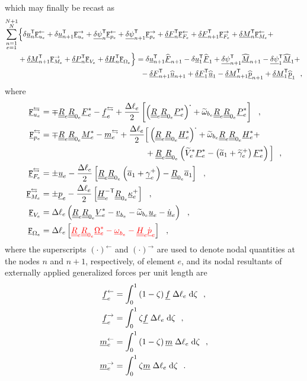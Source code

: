 \documentclass[12pt,a4paper,oneside,english]{abntex2} %
\newcommand{\fix}[1]{{\color{red}#1}}
\newcommand{\vect}[1]{\underline{#1}}
\newcommand{\uvec}[1]{\overline{#1}}
\def\tens#1{\underline{\underline{#1}}}
\def\til#1{\widetilde{#1}}
\def\lb{\left[}
\def\rb{\right]}
\def\lp{\left(}
\def\rp{\right)}
\def\T{\mathsf{T}}
\def\aone{\uvec{a}_1}
\def\aonetil{\til{a}_1}
\def\dotout{^{\boldsymbol{\cdot}}}
\def\R{\tens{R}}
\def\u{\vect{u}}
\def\udot{\dot{\u}}
\def\uhat{\widehat{\u}}
\def\gam{\vect{\gamma}}
\def\gamp{\gam^{+}}
\def\kap{\vect{\kappa}}
\def\kapp{\kap^{+}}
\def\V{\vect{V}}
\def\Vs{\V^{*}}
\def\Om{\vect{\Omega}}
\def\Oms{\Om^{*}}
\def\P{\vect{P}}
\def\Ps{\P^*}
\def\Hv{\vect{H}}
\def\Hvs{\Hv^*}
\def\H{\tens{H}}
\def\p{\vect{p}}
\def\pdot{\dot{\p}}
\def\phat{\widehat{\p}}
\def\F{\vect{F}}
\def\Fhat{\widehat{\F}}
\def\Fs{\F^*}
\def\M{\vect{M}}
\def\Mhat{\widehat{\M}}
\def\Ms{\M^*}
\def\f{\vect{f}}
\def\m{\vect{m}}
\def\delF{\vect{\delta F}}
\def\delM{\vect{\delta M}}
\def\delP{\vect{\delta P}}
\def\delH{\vect{\delta H}}
\def\delpsi{\vect{\delta\psi}}
\def\Deltal{\Delta \ell_e}
\def\dlotwo{\frac{\Deltal}{2}}
\def\d{\textnormal{d}}
\def\vbe{\vect{v}_{b_e}}
\def\ombe{\vect{\omega}_{b_e}}
\def\omtilbe{\til{\omega}_{b_e}}
\def\ue{\u_e}
\def\udote{\udot_e}
\def\pe{\p_e}
\def\pdote{\pdot_e}
\def\Vse{\Vs_e}
\def\Vtilse{\til{V}^*_{e}}
\def\Omse{\Oms_e}
\def\gampe{\gamp_e}
\def\kappe{\kapp_e}
\def\gamptile{\til{\gamma}^{+}_e}
\def\Fse{\Fs_e}
\def\Mse{\Ms_e}
\def\Pse{\Ps_e}
\def\Hse{\Hvs_e}
\def\He{\H_e}
\def\HinvTe{\H^{-\T}_e}
\def\fe{\f_e}
\def\me{\m_e}
\def\Re{\R_{e}}
\def\Rze{\R_{0_e}}
\def\Fu{\mathtt{\vect{F}}_{u_e}}
\def\Fum{\Fu^\leftarrow}
\def\Fup{\Fu^\rightarrow}
\def\Fump{\Fu^{\leftrightarrows}}
\def\Fp{\mathtt{\vect{F}}_{p_e}}
\def\Fpm{\Fp^\leftarrow}
\def\Fpp{\Fp^\rightarrow}
\def\Fpmp{\Fp^{\leftrightarrows}}
\def\FF{\mathtt{\vect{F}}_{F_e}}
\def\FFm{\FF^\leftarrow}
\def\FFp{\FF^\rightarrow}
\def\FFmp{\FF^{\leftrightarrows}}
\def\FM{\mathtt{\vect{F}}_{M_e}}
\def\FMm{\FM^\leftarrow}
\def\FMp{\FM^\rightarrow}
\def\FMmp{\FM^{\leftrightarrows}}
\def\FV{\mathtt{\vect{F}}_{V_e}}
\def\FO{\mathtt{\vect{F}}_{\Omega_e}}
\begin{document}
which may finally be recast as
\begin{align}
    \sum_{\substack{n=1\\e=1}}^{\substack{N+1\\N}}&\Bigl\{\Bigr.
    \delta\u_n^\T\Fum + \delta\u_{n+1}^\T\Fup +\delpsi_n^\T\Fpm + \delpsi_{n+1}^\T\Fpp
    +\delF_n^\T\FFm + \delF_{n+1}^\T\FFp
    +\delM_n^\T\FMm +
    \nonumber \\
    &+\delM_{n+1}^\T\FMp + \delP_n^\T\FV + \delH_n^\T\FO
	\Bigl.\Bigr\}
    =\delta\u_{n+1}^\T\Fhat_{n+1} - \delta\u_{1}^\T\Fhat_{1} + \delpsi_{n+1}^\T\Mhat_{n+1} - \delpsi_{1}^\T\Mhat_{1} +
    \nonumber \\
    &\hphantom{+\delM_{n+1}^\T\FMp + \delP_n^\T\FV + \delH_n^\T\FO
	\Bigl.\Bigr\}=}
    -\delF_{n+1}^\T\uhat_{n+1} + 
	\delF_{1}^\T\uhat_{1} -
	\delM_{n+1}^\T\phat_{n+1} +
	\delM_{1}^\T\phat_{1} \ \ ,
    \label{eq:motion_discretized3}
\end{align}
where
\begin{align}
    \Fump &= \mp\Re\Rze\Fse - \fe^\leftrightarrows + \dlotwo\lb\lp\Re\Rze\Pse\rp\dotout+\omtilbe\Re\Rze\Pse\rb \ \ , \label{eq:Fu} 
    \\
    \Fpmp &= \mp\Re\Rze\Mse - \me^\leftrightarrows + \dlotwo \Bigl[\Bigr.\lp\Re\Rze\Hse\rp\dotout+\omtilbe\Re\Rze\Hse + \nonumber \\
    &\hphantom{\mp\Re\Rze\Mse - \me^\leftrightarrows + \dlotwo\;\;\;\;\;} +\Re\Rze\lp\Vtilse\Pse-\lp\aonetil+\gamptile\rp\Fse\rp\Bigl.\Bigr] \ \ , \label{eq:Fp} 
    \\
    \FFmp &= \pm\ue - \dlotwo\lb\Re\Rze\lp\aone+\gampe\rp-\Rze\aone\rb  \ \ , \label{eq:FF} 
    \\
    \FMmp &= \pm\pe - \dlotwo\lb\HinvTe\Rze\kappe\rb \ \ , \label{eq:FM} 
    \\
    \FV &= \Deltal\lp\Re\Rze\Vse-\vbe-\omtilbe\ue-\udote\rp \ \ , \label{eq:FP} 
    \\
    \FO &= \Deltal\lb\fix{\Re\Rze\Omse-\ombe-\He\pdote}\rb \ \ , 
    \label{eq:FH}
\end{align}
where the superscripts $\lp\cdot\rp^\leftarrow$ and $\lp\cdot\rp^\rightarrow$ are used to denote nodal quantities at the nodes $n$ and $n+1$, respectively, of element $e$, and its nodal resultants of externally applied generalized forces per unit length are
\begin{equation}
    \begin{aligned}
        \fe^\leftarrow &= \int_0^1\lp1-\zeta\rp\f \;\Deltal\;\d\zeta \ \ ,
        \\
        \fe^\rightarrow &= \int_0^1\zeta\f \;\Deltal\;\d\zeta \ \ ,
        \\
        \me^\leftarrow &= \int_0^1\lp1-\zeta\rp\m \;\Deltal\;\d\zeta  \ \ ,
        \\
        \me^\rightarrow &= \int_0^1\zeta\m \;\Deltal\;\d\zeta \ \ .
        \label{eq:fmp_mmp}
    \end{aligned}
\end{equation}
\end{document}
